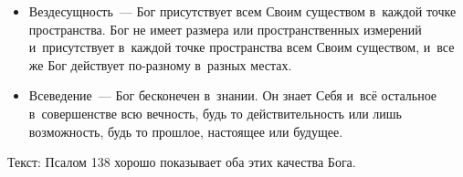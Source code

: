 \documentclass[a4paper,12pt]{article}
\begin{document}
\begin{itemize}
    \item Вездесущность~--- Бог присутствует всем Своим существом в~каждой точке пространства. Бог не имеет размера или пространственных измерений и~присутствует в~каждой точке пространства всем Своим существом, и~все же Бог действует по-разному в~разных местах.

    \item Всеведение~--- Бог бесконечен в~знании. Он знает Себя и~всё остальное в~совершенстве всю вечность, будь то действительность или лишь возможность, будь то прошлое, настоящее или будущее.
\end{itemize}

\noindent Текст: Псалом 138 хорошо показывает оба этих качества Бога. 
\end{document}
